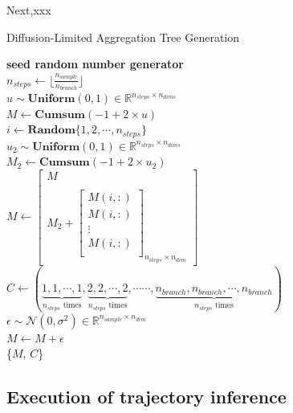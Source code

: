 Next,xxx 


\begin{algorithm}
\caption{Diffusion-Limited Aggregation Tree Generation}
\label{alg:DLA}
    \textbf{seed random number generator}\\
    $n_{steps} \gets \lfloor\frac{n_{sample}}{n_{branch}}\rfloor$\\
    $u \sim \textbf{Uniform}(0,1)\in\mathbb{R}^{n_{steps} \times n_{dims}}$\\
    $M \gets \textbf{Cumsum}(-1 + 2 \times u)$\\
    {
         $i \gets \textbf{Random}\{1,2,\cdots, n_{steps}\}$\\
         $u_2 \sim \textbf{Uniform}(0,1)\in\mathbb{R}^{n_{steps} \times n_{dims}}$\\
         $M_2 \gets \textbf{Cumsum}(-1 + 2 \times u_2)$\\
        $M \gets \begin{bmatrix}M \\\\
            M_2 +\left[\begin{array}{c} 
                M(i, :)\\
                M(i, :)\\
                \vdots\\
                M(i, :)\\
        \end{array}\right]_{n_{steps}\times n_{dim}} \end{bmatrix}$\\
    }
    $C \gets (\underbrace{1,1,\cdots, 1}_{n_{steps} \text{ times}}, \underbrace{2,2,\cdots, 2}_{n_{steps} \text{ times}},  \cdots\cdots, \underbrace{n_{branch},n_{branch},\cdots, n_{branch}}_{n_{steps} \text{ times}})$\\
    $\epsilon \sim \mathcal{N}(0, \sigma^2)\in\mathbb{R}^{n_{sample}\times n_{dim}}$\\
    $M \gets M + \epsilon$\\
    \Return \{$M$, $C$\}\\
\end{algorithm}

\subsection{Execution of trajectory inference}
